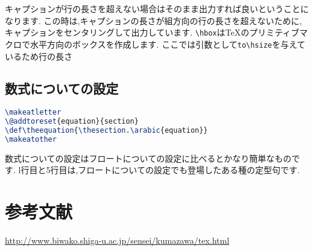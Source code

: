 キャプションが行の長さを超えない場合はそのまま出力すれば良いということになります.
この時は,キャプションの長さが組方向の行の長さを超えないために,キャプションをセンタリングして出力しています.
\verb|\hbox|は{\TeX}のプリミティブマクロで水平方向のボックスを作成します.
ここでは引数として\verb|to\hsize|を与えているため行の長さ

\subsection{数式についての設定}
\begin{lstlisting}[caption = 数式まわりの設定, label = list:eq, language = tex]
\makeatletter
\@addtoreset{equation}{section}
\def\theequation{\thesection.\arabic{equation}}
\makeatother
\end{lstlisting}

数式についての設定はフロートについての設定に比べるとかなり簡単なものです.
l行目と5行目は,フロートについての設定でも登場したある種の定型句です.

\section*{参考文献}
\url{http://www.biwako.shiga-u.ac.jp/sensei/kumazawa/tex.html}
